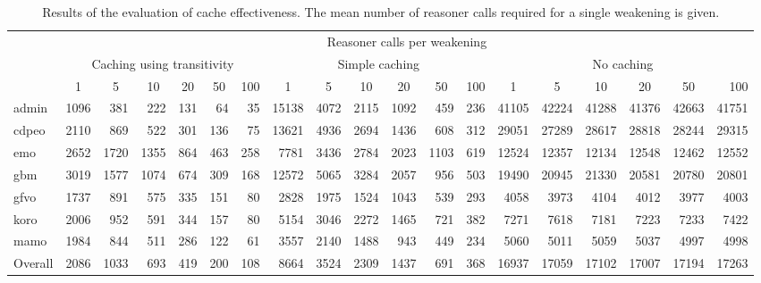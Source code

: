 \begin{table}[ht]
  \scriptsize
  \begin{widepage}[5cm]
    \centering
    \begin{tabular}{|l|rrrrrr|rrrrrr|rrrrrr|}
      \hline
      & \multicolumn{18}{c|}{\hspace{-9mm}Reasoner calls per weakening} \\
      & \multicolumn{6}{c}{Caching using transitivity} & \multicolumn{6}{c}{Simple caching} & \multicolumn{6}{c|}{No caching} \\
      & \multicolumn{1}{c}{1} & \multicolumn{1}{c}{5} & \multicolumn{1}{c}{10} & \multicolumn{1}{c}{20} & \multicolumn{1}{c}{50} & \multicolumn{1}{c}{100} & \multicolumn{1}{c}{1} & \multicolumn{1}{c}{5} & \multicolumn{1}{c}{10} & \multicolumn{1}{c}{20} & \multicolumn{1}{c}{50} & \multicolumn{1}{c}{100} & \multicolumn{1}{c}{1} & \multicolumn{1}{c}{5} & \multicolumn{1}{c}{10} & \multicolumn{1}{c}{20} & \multicolumn{1}{c}{50} & 100 \\
      \hline
      admin & 1096 & 381 & 222 & 131 & 64 & 35
        & 15138 & 4072 & 2115 & 1092 & 459 & 236
        & 41105 & 42224 & 41288 & 41376 & 42663 & 41751 \\
      cdpeo & 2110 & 869 & 522 & 301 & 136 & 75
        & 13621 & 4936 & 2694 & 1436 & 608 & 312
        & 29051 & 27289 & 28617 & 28818 & 28244 & 29315 \\
      emo & 2652 & 1720 & 1355 & 864 & 463 & 258
        & 7781 & 3436 & 2784 & 2023 & 1103 & 619
        & 12524 & 12357 & 12134 & 12548 & 12462 & 12552 \\
      gbm & 3019 & 1577 & 1074 & 674 & 309 & 168
        & 12572 & 5065 & 3284 & 2057 & 956 & 503
        & 19490 & 20945 & 21330 & 20581 & 20780 & 20801 \\
      gfvo &  1737 & 891 & 575 & 335 & 151 & 80
        & 2828 & 1975 & 1524 & 1043 & 539 & 293
        & 4058 & 3973 & 4104 & 4012 & 3977 & 4003 \\
      koro & 2006 & 952 & 591 & 344 & 157 & 80
        & 5154 & 3046 & 2272 & 1465 & 721 & 382
        & 7271 & 7618 & 7181 & 7223 & 7233 & 7422 \\
      mamo &  1984 & 844 & 511 & 286 & 122 & 61
        & 3557 & 2140 & 1488 & 943 & 449 & 234
        & 5060 & 5011 & 5059 & 5037 & 4997 & 4998 \\
      \hline
      Overall & 2086 & 1033 & 693 & 419 & 200 & 108
        & 8664 & 3524 & 2309 & 1437 & 691 & 368
        & 16937 & 17059 & 17102 & 17007 & 17194 & 17263 \\
      \hline
    \end{tabular}
  \end{widepage}
  \caption{Results of the evaluation of cache effectiveness. The mean number of reasoner calls required for a single weakening is given.}
\end{table}

